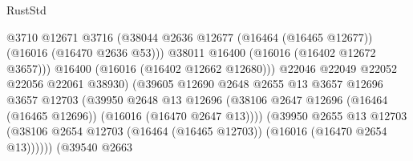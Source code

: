\begin{lexlean}{RustStd}
\begin{coremodule}
                                              @3710
                                              @12671
                                              @3716
                                              (@38044
                                                @2636
                                                @12677
                                                (@16464 (@16465 @12677))
                                                (@16016 (@16470 @2636 @53)))
                                              @38011
                                              @16400
                                              (@16016 (@16402 @12672 @3657)))
                                            @16400
                                            (@16016 (@16402 @12662 @12680)))
                                          @22046
                                          @22049
                                          @22052
                                          @22056
                                          @22061
                                          @38930)
                                        (@39605
                                          @12690
                                          @2648
                                          @2655
                                          @13
                                          @3657
                                          @12696
                                          @3657
                                          @12703
                                          (@39950
                                            @2648
                                            @13
                                            @12696
                                            (@38106
                                              @2647
                                              @12696
                                              (@16464 (@16465 @12696))
                                              (@16016 (@16470 @2647 @13))))
                                          (@39950
                                            @2655
                                            @13
                                            @12703
                                            (@38106
                                              @2654
                                              @12703
                                              (@16464 (@16465 @12703))
                                              (@16016 (@16470 @2654 @13))))))
                                      (@39540
                                        @2663

\end{coremodule}
\end{lexlean}
